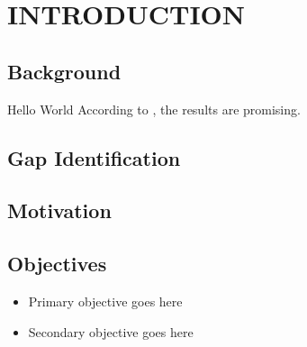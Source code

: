 \chapter{INTRODUCTION}
\section{Background}
Hello World
According to \cite{edcd}, the results are promising.



\section{Gap Identification}


\section{Motivation}

\section{Objectives}
\begin{itemize}
  \item Primary objective goes here
  \item Secondary objective goes here
\end{itemize}
